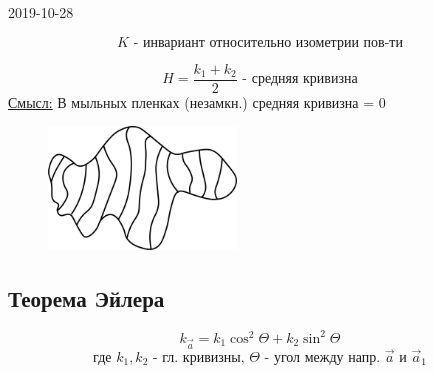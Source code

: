 \documentclass[main]{subfiles}
\begin{document}
\begin{lect}{2019-10-28}
      \begin{Utv}
          \[K \text{ - инвариант относительно изометрии пов-ти}\]
      \end{Utv}

      \begin{Definition}
          \[H = \frac{k_1 + k_2}{2} \text{ - средняя кривизна}\]
          \ul{Смысл:} В мыльных пленках (незамкн.) средняя кривизна = 0
          \begin{figure}[H]
              \includegraphics[width=5cm]{pics/8_5.png}
              \centering
          \end{figure}

      \end{Definition}

      \subsection{Теорема Эйлера}
      \begin{Theorem}[Эйлера]
          \[k_{\vec{a}} = k_1 \cos^2 \Theta + k_2 \sin^2\Theta \]
          \[\text{где } k_1, k_2 \text{ - гл. кривизны, } \Theta \text{ - угол между
          напр. } \vec{a} \text{ и } \vec{a}_1\]
      \end{Theorem}


\end{lect}
\end{document}
